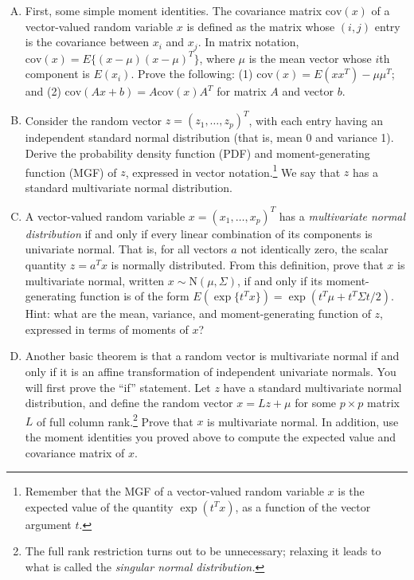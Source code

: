 \documentclass[11pt]{article}
\newcommand{\N}{\mbox{N}}
\begin{document}
\begin{enumerate}[(A)]

\item First, some simple moment identities.  The covariance matrix $\mbox{cov}(x)$ of a vector-valued random variable $x$ is defined as the matrix whose $(i,j)$ entry is the covariance between $x_i$ and $x_j$.  In matrix notation, $\mbox{cov}(x) = E\{ (x - \mu) (x - \mu)^T \}$, where $\mu$ is the mean vector whose $i$th component is $E(x_i)$.  Prove the following: (1) $\mbox{cov}(x) = E(xx^T) - \mu \mu^T$; and (2) $\mbox{cov}(Ax + b) = A \mbox{cov}(x) A^T$ for matrix $A$ and vector $b$.

\item Consider the random vector $z = (z_1, \ldots, z_p)^T$, with each entry having an independent standard normal distribution (that is, mean 0 and variance 1).  Derive the probability density function (PDF) and moment-generating function (MGF) of $z$, expressed in vector notation.\footnote{Remember that the MGF of a vector-valued random variable $x$ is the expected value of the quantity $\exp(t^T x)$, as a function of the vector argument $t$.}   We say that $z$ has a standard multivariate normal distribution.

\item A vector-valued random variable $x = (x_1, \ldots, x_p)^T$ has a \textit{multivariate normal distribution} if and only if every linear combination of its components is univariate normal.  That is, for all vectors $a$ not identically zero, the scalar quantity $z = a^T x$ is normally distributed.  From this definition, prove that $x$ is multivariate normal, written $x \sim \N(\mu, \Sigma)$, if and only if its moment-generating function is of the form $E(\exp \{t^T x\}) = \exp(t^T \mu + t^T \Sigma t / 2)$.  Hint: what are the mean, variance, and moment-generating function of $z$, expressed in terms of moments of $x$?

\item Another basic theorem is that a random vector is multivariate normal if and only if it is an affine transformation of independent univariate normals.  You will first prove the ``if'' statement.  Let $z$ have a standard multivariate normal distribution, and define the random vector $x = L z + \mu$ for some $p \times p$ matrix $L$ of full column rank.\footnote{The full rank restriction turns out to be unnecessary; relaxing it leads to what is called the \textit{singular normal distribution.}}   Prove that $x$ is multivariate normal.  In addition, use the moment identities you proved above to compute the expected value and covariance matrix of $x$.  


\end{enumerate}
\end{document}
